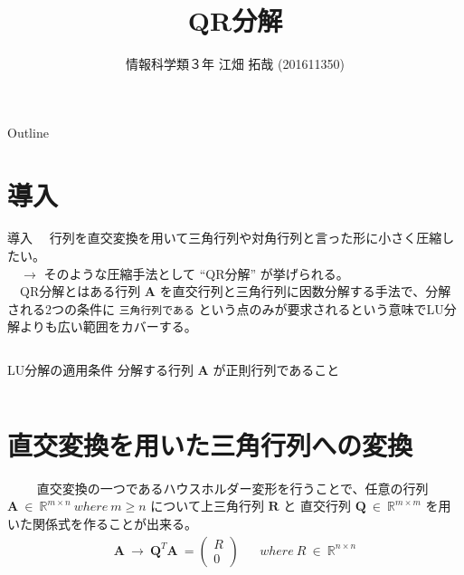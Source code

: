 \documentclass[dvipdfmx,10pt,presentation]{beamer}
\author{情報科学類３年 江畑 拓哉 (201611350)}
\date{}
\title{QR分解}
\begin{document}
\maketitle
\begin{frame}{Outline}
\tableofcontents
\end{frame}


\section{導入}
\label{sec:org8b216b6}
\begin{frame}[fragile,label={sec:org5db5098}]{導入}
 　行列を直交変換を用いて三角行列や対角行列と言った形に小さく圧縮したい。\\
　\(\rightarrow\) そのような圧縮手法として ``QR分解'' が挙げられる。\\

　QR分解とはある行列 \(\bm{A}\) を直交行列と三角行列に因数分解する手法で、分解される2つの条件に \texttt{三角行列である} という点のみが要求されるという意味でLU分解よりも広い範囲をカバーする。\\
\begin{columns}
\begin{column}{1.00\columnwidth}
\begin{block}{LU分解の適用条件}
分解する行列 \(\bm{A}\) が正則行列であること\\
\end{block}
\end{column}
\end{columns}
\end{frame}

\section{直交変換を用いた三角行列への変換}
\label{sec:orgd34029b}
\begin{frame}[label={sec:orgc41dc30}]{　}
　直交変換の一つであるハウスホルダー変形を行うことで、任意の行列 \(\bm{A}\ \in \ \mathbb{R}^{m \times n}\ where\ m \geq n\) について上三角行列 \(\bm{R}\) と 直交行列 \(\bm{Q}\ \in\ \mathbb{R}^{m \times m}\) を用いた関係式を作ることが出来る。\\

\begin{align*}
\bm{A}\ \rightarrow\ \bm{Q}^T\bm{A}\ = \begin{pmatrix}R \\ 0\end{pmatrix}
&& where\ R\ \in\ \mathbb{R}^{n\times n}
\end{align*}
\end{frame}
\end{document}

